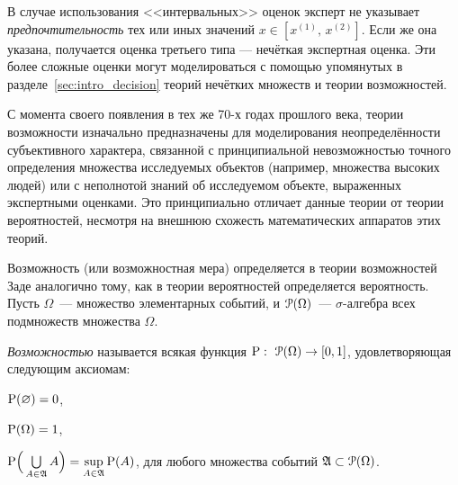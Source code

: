 В случае использования <<интервальных>> оценок эксперт не указывает {\sl предпочтительность} тех или иных значений $x \in [x^{(1)},\, x^{(2)}]$. Если же она указана, получается оценка третьего типа --- нечёткая экспертная оценка. Эти более сложные оценки могут моделироваться с помощью упомянутых в разделе~\ref{sec:intro_decision} теорий нечётких множеств и теории возможностей.

С момента своего появления в тех же 70-х годах прошлого века, теории возможности изначально предназначены для моделирования неопределённости субъективного характера, связанной с принципиальной невозможностью точного определения множества исследуемых объектов (например, множества высоких людей) или с неполнотой знаний об исследуемом объекте, выраженных экспертными оценками. Это принципиально отличает данные теории от теории вероятностей, несмотря на внешнюю схожесть математических аппаратов этих теорий. 

Возможность (или возможностная мера) определяется в теории возможностей Заде \cite{citeZadeh, dubois_prade-1990} аналогично тому, как в теории вероятностей определяется вероятность. Пусть $\Omega$~--- множество элементарных событий, и $\Po(\Omega)$~--- $\sigma$-алгебра всех подмножеств множества $\Omega$.
\begin{definition}
\label{def_possibility}
\emph{Возможностью} называется всякая функция $\P:\ \Po(\Omega)\to[0,1]$, удовлетворяющая следующим аксиомам:
\begin{compactenum}
\item $\P(\varnothing) = 0$,\label{axiom_P1}
\item $\P(\Omega) = 1$,\label{axiom_P2}
\item $\P\Big(\bigcup\limits_{A\in\Alg} A\Big) = \sup\limits_{A\in\Alg}\P(A)$, для любого множества событий $\Alg\subset\Po(\Omega)$.\label{axiom_P3}
\end{compactenum}
\end{definition}

